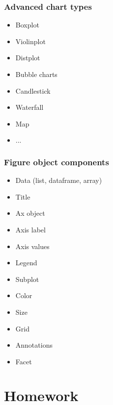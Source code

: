 \documentclass{beamer}
\begin{document}
\begin{frame}
    \frametitle{Advanced chart types}
    \begin{itemize}
        \item Boxplot
        \item Violinplot
        \item Distplot
        \item Bubble charts
        \item Candlestick
        \item Waterfall
        \item Map
        \item ...
    \end{itemize}

\end{frame}

\begin{frame}
\frametitle{Figure object components}
    \begin{itemize}
        \item Data (list, dataframe, array)
        \item Title
        \item Ax object
        \item Axis label
        \item Axis values
        \item Legend
        \item Subplot
        \item Color
        \item Size
        \item Grid
        \item Annotations
        \item Facet 
    \end{itemize}
\end{frame}


\section{Homework} 
\end{document}
